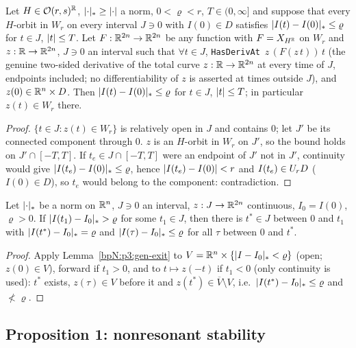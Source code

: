 \begin{corollary}\label{bpN:p7:stopped-extension}
Let $H\in\mathcal O(r,s)^{\mathbb{R}}$, $\lvert \cdot\rvert_*\ge\lvert \cdot\rvert$ a norm, $0<\varrho<r$, $T\in(0,\infty]$ and suppose that every $H$-orbit in $W_r$ on every interval $J\ni0$ with $I(0)\in D$ satisfies $\lvert I(t)-I(0)\rvert_*\le\varrho$ for $t\in J$, $\lvert t\rvert\le T$. Let $F:\mathbb{R}^{2n}\to\mathbb{R}^{2n}$ be any function with $F=X_{H^{\mathbb{R}}}$ on $W_r$ and $z:\mathbb{R}\to\mathbb{R}^{2n}$, $J\ni0$ an interval such that $\forall t\in J$, \texttt{HasDerivAt}\ $z\,(F(z\,t))\,t$ (the genuine two-sided derivative of the total curve $z:\mathbb{R}\to\mathbb{R}^{2n}$ at every time of $J$, endpoints included; no differentiability of $z$ is asserted at times outside $J$), and $z(0)\in\mathbb{R}^n\times D$. Then $\lvert I(t)-I(0)\rvert_*\le\varrho$ for $t\in J$, $\lvert t\rvert\le T$; in particular $z(t)\in W_r$ there.
\end{corollary}
\begin{proof}
\label{stepN:p7:se-stop} $\{t\in J:z(t)\in W_r\}$ is relatively open in $J$ and contains $0$; let $J'$ be its connected component through $0$. $z$ is an $H$-orbit in $W_r$ on $J'$, so the bound holds on $J'\cap[-T,T]$.
\label{stepN:p7:se-noexit} If $t_e\in J\cap[-T,T]$ were an endpoint of $J'$ not in $J'$, continuity would give $\lvert I(t_e)-I(0)\rvert_*\le\varrho$, hence $\lvert I(t_e)-I(0)\rvert<r$ and $I(t_e)\in U_{r}D$ ($I(0)\in D$), so $t_e$ would belong to the component: contradiction.
\end{proof}

\begin{lemma}\label{bpN:p7:exit-ball}
Let $\lvert \cdot\rvert_*$ be a norm on $\mathbb{R}^n$, $J\ni0$ an interval, $z:J\to\mathbb{R}^{2n}$ continuous, $I_0=I(0)$, $\varrho>0$. If $\lvert I(t_1)-I_0\rvert_*>\varrho$ for some $t_1\in J$, then there is $t^*\in J$ between $0$ and $t_1$ with $\lvert I(t^*)-I_0\rvert_*=\varrho$ and $\lvert I(\tau)-I_0\rvert_*\le\varrho$ for all $\tau$ between $0$ and $t^*$.
\end{lemma}
\begin{proof}
\label{stepN:p7:eb-exit} Apply Lemma~\ref{bpN:p3:gen-exit} to $V=\mathbb{R}^n\times\{\lvert I-I_0\rvert_*<\varrho\}$ (open; $z(0)\in V$), forward if $t_1>0$, and to $t\mapsto z(-t)$ if $t_1<0$ (only continuity is used): $t^*$ exists, $z(\tau)\in V$ before it and $z(t^*)\in\overline V\setminus V$, i.e.\ $\lvert I(t^*)-I_0\rvert_*\le\varrho$ and $\not<\varrho$.
\end{proof}

\subsection{Proposition 1: nonresonant stability}\label{bpN:p7:s-nr}

